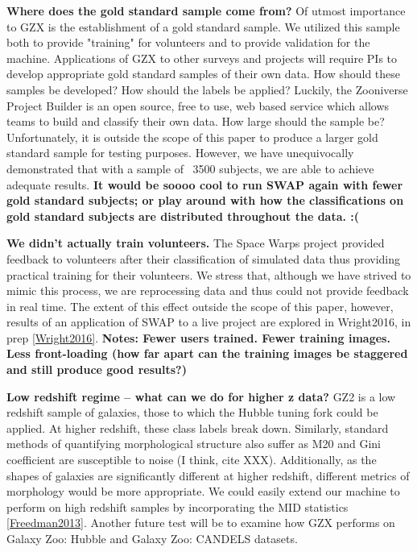 \documentclass[twocolumn]{aastex6}
\begin{document}
\textbf{Where does the gold standard sample come from?}
Of utmost importance to GZX is the establishment of a gold standard sample. 
We utilized this sample both to provide "training" for volunteers and to provide 
validation for the machine. Applications of GZX to other surveys and projects will
require PIs to develop appropriate gold standard samples of their own data. 
How should these samples be developed?
How should the labels be applied? Luckily, the Zooniverse Project Builder is an 
open source, free to use, web based service which allows teams to build and classify
their own data.
 How large should the sample be?  Unfortunately, it is outside the scope of this paper
to produce a larger gold standard sample for testing purposes. However, we have 
unequivocally demonstrated that with a sample of ~3500 subjects, we are able to 
achieve adequate results. 
\textbf{It would be soooo cool to run SWAP again with fewer gold standard subjects; 
or play around with how the classifications on gold standard subjects are distributed throughout the data. :(}


\textbf{We didn't actually train volunteers.}
The Space Warps project provided feedback to volunteers after their classification
of simulated data thus providing practical training for their volunteers. We stress 
that, although we have strived to mimic this process, we are reprocessing data and
thus could not provide feedback in real time. The extent of this effect outside the scope
of this paper, however, results of an application of SWAP to a live project 
are explored in Wright2016, in prep \ref{Wright2016}. 
\textbf{Notes: Fewer users trained. Fewer training images. 
Less front-loading (how far apart can the training images be staggered and still produce good results?)}


\textbf{Low redshift regime -- what can we do for higher z data?}
GZ2 is a low redshift sample of galaxies, those to which the Hubble tuning fork 
could be applied. At higher redshift, these class labels break down. 
Similarly, standard methods of quantifying morphological structure also 
suffer as M20 and Gini coefficient are susceptible to noise (I think, cite XXX).
Additionally, as the shapes of galaxies are significantly different at higher 
redshift, different metrics of morphology would be more appropriate. 
We could easily extend our machine to perform on high redshift samples
by incorporating the MID statistics \ref{Freedman2013}. Another future
test will be to examine how GZX performs on Galaxy Zoo: Hubble and 
Galaxy Zoo: CANDELS datasets. 
\end{document}
